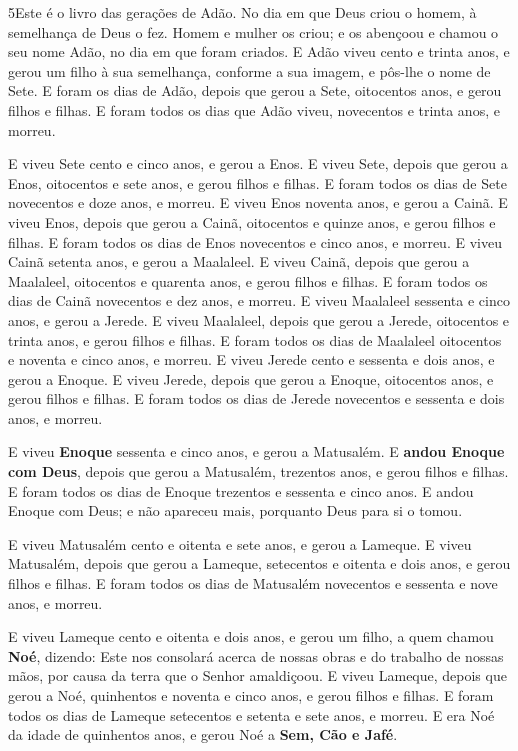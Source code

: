 \smallskip

\lettrine{5} Este é o livro das gerações de Adão. No dia em
que Deus criou o homem, à semelhança de Deus o fez. Homem e
mulher os criou; e os abençoou e chamou o seu nome Adão, no dia em
que foram criados. E Adão viveu cento e trinta anos, e gerou um
filho à sua semelhança, conforme a sua imagem, e pôs-lhe o nome de
Sete. E foram os dias de Adão, depois que gerou a Sete,
oitocentos anos, e gerou filhos e filhas. E foram todos os dias
que Adão viveu, novecentos e trinta anos, e morreu.

E viveu Sete cento e cinco anos, e gerou a Enos. E viveu Sete,
depois que gerou a Enos, oitocentos e sete anos, e gerou filhos e
filhas. E foram todos os dias de Sete novecentos e doze anos, e
morreu. E viveu Enos noventa anos, e gerou a Cainã. E
viveu Enos, depois que gerou a Cainã, oitocentos e quinze anos, e
gerou filhos e filhas. E foram todos os dias de Enos
novecentos e cinco anos, e morreu. E viveu Cainã setenta
anos, e gerou a Maalaleel. E viveu Cainã, depois que gerou a
Maalaleel, oitocentos e quarenta anos, e gerou filhos e filhas.
E foram todos os dias de Cainã novecentos e dez anos, e
morreu. E viveu Maalaleel sessenta e cinco anos, e gerou a
Jerede. E viveu Maalaleel, depois que gerou a Jerede,
oitocentos e trinta anos, e gerou filhos e filhas. E foram
todos os dias de Maalaleel oitocentos e noventa e cinco anos, e
morreu. E viveu Jerede cento e sessenta e dois anos, e gerou
a Enoque. E viveu Jerede, depois que gerou a Enoque,
oitocentos anos, e gerou filhos e filhas. E foram todos os
dias de Jerede novecentos e sessenta e dois anos, e morreu.

E viveu \textbf{Enoque} sessenta e cinco anos, e gerou a
Matusalém. E \textbf{andou Enoque com Deus}, depois que gerou
a Matusalém, trezentos anos, e gerou filhos e filhas. E foram
todos os dias de Enoque trezentos e sessenta e cinco anos. E
andou Enoque com Deus; e não apareceu mais, porquanto Deus para si o
tomou.

E viveu Matusalém cento e oitenta e sete anos, e gerou a Lameque.
E viveu Matusalém, depois que gerou a Lameque, setecentos e
oitenta e dois anos, e gerou filhos e filhas. E foram todos
os dias de Matusalém novecentos e sessenta e nove anos, e morreu.

E viveu Lameque cento e oitenta e dois anos, e gerou um filho,
a quem chamou \textbf{Noé}, dizendo: Este nos consolará
acerca de nossas obras e do trabalho de nossas mãos, por causa da
terra que o Senhor amaldiçoou. E viveu Lameque, depois que
gerou a Noé, quinhentos e noventa e cinco anos, e gerou filhos e
filhas. E foram todos os dias de Lameque setecentos e setenta
e sete anos, e morreu. E era Noé da idade de quinhentos anos,
e gerou Noé a \textbf{Sem, Cão e Jafé}.

